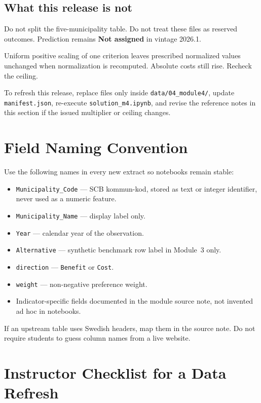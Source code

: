 \documentclass[11pt,a4paper]{article}
\begin{document}
\subsection{What this release is not}

Do not split the five-municipality table.
Do not treat these files as reserved outcomes.
Prediction remains \textbf{Not assigned} in vintage 2026.1.

Uniform positive scaling of one criterion leaves prescribed
normalized values unchanged when normalization is recomputed.
Absolute costs still rise. Recheck the ceiling.

To refresh this release, replace files only inside
\texttt{data/04\_module4/}, update \texttt{manifest.json},
re-execute \texttt{solution\_m4.ipynb}, and revise the reference
notes in this section if the issued multiplier or ceiling changes.

\section{Field Naming Convention}

Use the following names in every new extract so notebooks remain
stable:
\begin{itemize}
    \item \texttt{Municipality\_Code} --- SCB kommun-kod, stored as text
    or integer identifier, never used as a numeric feature.
    \item \texttt{Municipality\_Name} --- display label only.
    \item \texttt{Year} --- calendar year of the observation.
    \item \texttt{Alternative} --- synthetic benchmark row label in
    Module~3 only.
    \item \texttt{direction} --- \texttt{Benefit} or \texttt{Cost}.
    \item \texttt{weight} --- non-negative preference weight.
    \item Indicator-specific fields documented in the module source
    note, not invented ad hoc in notebooks.
\end{itemize}

If an upstream table uses Swedish headers, map them in the source note.
Do not require students to guess column names from a live website.

\section{Instructor Checklist for a Data Refresh}
\end{document}
